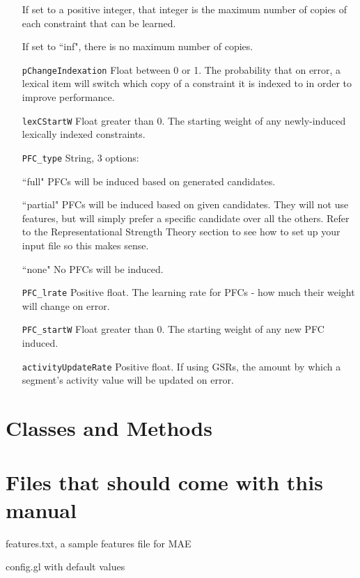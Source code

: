 \documentclass[12]{article}
\begin{document}
\begin{itemize}
	If set to a positive integer, that integer is the maximum number of copies of each constraint that can be learned.
	
	If set to ``inf", there is no maximum number of copies.
	
	\item[\texttt{pChangeIndexation}] Float between 0 or 1.  The probability that on error, a lexical item will switch which copy of a constraint it is indexed to in order to improve performance.
	
	\item[\texttt{lexCStartW}] Float greater than 0.  The starting weight of any newly-induced lexically indexed constraints.
	
	\item[\texttt{PFC\_type}] String, 3 options:
	
	``full" PFCs will be induced based on generated candidates.
	
	``partial" PFCs will be induced based on given candidates.  They will not use features, but will simply prefer a specific candidate over all the others.  Refer to the Representational Strength Theory section to see how to set up your input file so this makes sense.
	
	``none" No PFCs will be induced.
	
	\item[\texttt{PFC\_lrate}]  Positive float.  The learning rate for PFCs - how much their weight will change on error.

	\item[\texttt{PFC\_startW}]	Float greater than 0.  The starting weight of any new PFC induced.

	\item[\texttt{activityUpdateRate}]  Positive float.  If using GSRs, the amount by which a segment's activity value will be updated on error.
	
\end{itemize}




\section{Classes and Methods}

\section{Files that should come with this manual}
features.txt, a sample features file for MAE

config.gl with default values
\end{document}
